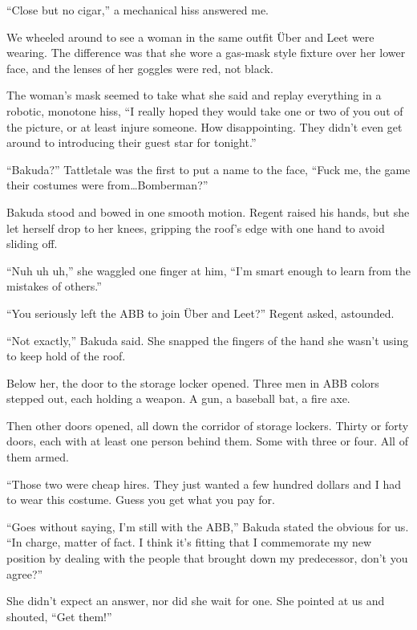 ``Close but no cigar,'' a mechanical hiss answered me.



We wheeled around to see a woman in the same outfit \"{U}ber and Leet were wearing.  The difference was that she wore a gas-mask style fixture over her lower face, and the lenses of her goggles were red, not black.



The woman's mask seemed to take what she said and replay everything in a robotic, monotone hiss, ``I really hoped they would take one or two of you out of the picture, or at least injure someone.  How disappointing.  They didn't even get around to introducing their guest star for tonight.''



``Bakuda?'' Tattletale was the first to put a name to the face, ``Fuck me, the game their costumes were from\ldots Bomberman?''



Bakuda stood and bowed in one smooth motion.  Regent raised his hands, but she let herself drop to her knees, gripping the roof's edge with one hand to avoid sliding off.



``Nuh uh uh,'' she waggled one finger at him, ``I'm smart enough to learn from the mistakes of others.''



``You seriously left the ABB to join \"{U}ber and Leet?'' Regent asked, astounded.



``Not exactly,'' Bakuda said.  She snapped the fingers of the hand she wasn't using to keep hold of the roof.



Below her, the door to the storage locker opened.  Three men in ABB colors stepped out, each holding a weapon.  A gun, a baseball bat, a fire axe.



Then other doors opened, all down the corridor of storage lockers.  Thirty or forty doors, each with at least one person behind them.  Some with three or four.  All of them armed.



``Those two were cheap hires.  They just wanted a few hundred dollars and I had to wear this costume.  Guess you get what you pay for.



``Goes without saying, I'm still with the ABB,'' Bakuda stated the obvious for us.  ``In charge, matter of fact.  I think it's fitting that I commemorate my new position by dealing with the people that brought down my predecessor, don't you agree?''



She didn't expect an answer, nor did she wait for one.  She pointed at us and shouted, ``Get them!''





